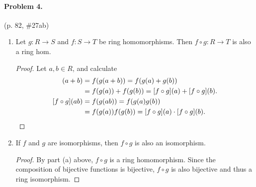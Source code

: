 \documentclass[12pt]{article}
\begin{document}
\paragraph{Problem 4.} (p. 82, \#27ab)

\begin{enumerate}
\item[a.] Let $g : R \to S$ and $f : S \to T$ be ring homomorphisms. Then $f\circ g : R \to T$ is also a ring hom. \begin{proof}
    Let $a, b \in R$, and calculate
    \begin{align*}
        [f\circ g](a + b) &= f(g(a+b)) = f(g(a) + g(b)) \\ &= f(g(a)) + f(g(b)) = [f\circ g](a) + [f\circ g](b). \\
        [f\circ g](ab) &= f(g(ab)) = f(g(a)g(b)) \\ &= f(g(a)) f(g(b)) = [f\circ g](a)\cdot [f\circ g](b).\qedhere
    \end{align*}
\end{proof}
\item[b.] If $f$ and $g$ are isomorphisms, then $f\circ g$ is also an isomorphism.
\begin{proof}
    By part (a) above, $f \circ g$ is a ring homomorphism. Since the composition of bijective functions is bijective, $f \circ g$ is also bijective and thus a ring isomorphism.
\end{proof}
\end{enumerate}
\end{document}
